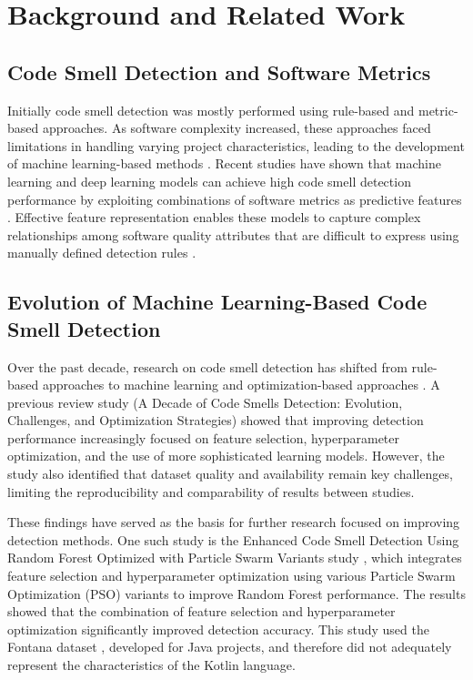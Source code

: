\documentclass[]{einformatica}
\begin{document}
\section{Background and Related Work}\label{sec:Background}
\subsection{Code Smell Detection and Software Metrics}

Initially code smell detection was mostly performed using rule-based and metric-based approaches. As software complexity increased, these approaches faced limitations in handling varying project characteristics, leading to the development of machine learning-based methods \cite{THAKUR2026112784}\cite{Alodibat2026}\cite{MESBAH2026108242}. Recent studies have shown that machine learning and deep learning models can achieve high code smell detection performance by exploiting combinations of software metrics as predictive features \cite{Dewangan2022}. Effective feature representation enables these models to capture complex relationships among software quality attributes that are difficult to express using manually defined detection rules \cite{Liu2021}\cite{abdelkader2025novel}.

\subsection{Evolution of Machine Learning-Based Code Smell Detection}

Over the past decade, research on code smell detection has shifted from rule-based approaches to machine learning and optimization-based approaches \cite{THAKUR2026112784}\cite{Alodibat2026}\cite{MESBAH2026108242}. A previous review study (A Decade of Code Smells Detection: Evolution, Challenges, and Optimization Strategies) \cite{WibowoICITEE2025} showed that improving detection performance increasingly focused on feature selection, hyperparameter optimization, and the use of more sophisticated learning models. However, the study also identified that dataset quality and availability remain key challenges, limiting the reproducibility and comparability of results between studies.

These findings have served as the basis for further research focused on improving detection methods. One such study is the Enhanced Code Smell Detection Using Random Forest Optimized with Particle Swarm Variants study \cite{Wibowo2026}, which integrates feature selection and hyperparameter optimization using various Particle Swarm Optimization (PSO) variants to improve Random Forest performance. The results showed that the combination of feature selection and hyperparameter optimization significantly improved detection accuracy. This study used the Fontana dataset \cite{Fontana2017}\cite{Mhawish2020}\cite{Zellagui2026}, developed for Java projects, and therefore did not adequately represent the characteristics of the Kotlin language.
\end{document}
